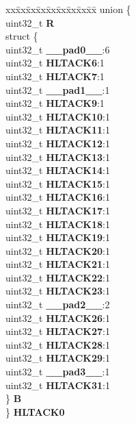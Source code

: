 \begin{DoxyCompactItemize}
\begin{tabbing}
\end{tabbing}\item 
\mbox{\label{structSIU__tag_a91b2244d376d46e3a6b73408ff06a8c1}} 
\begin{tabbing}
xx\=xx\=xx\=xx\=xx\=xx\=xx\=xx\=xx\=\kill
union \{\\
\>uint32\_t {\bfseries R}\\
\>struct \{\\
\>\>uint32\_t {\bfseries \_\_pad0\_\_}:6\\
\>\>uint32\_t {\bfseries HLTACK6}:1\\
\>\>uint32\_t {\bfseries HLTACK7}:1\\
\>\>uint32\_t {\bfseries \_\_pad1\_\_}:1\\
\>\>uint32\_t {\bfseries HLTACK9}:1\\
\>\>uint32\_t {\bfseries HLTACK10}:1\\
\>\>uint32\_t {\bfseries HLTACK11}:1\\
\>\>uint32\_t {\bfseries HLTACK12}:1\\
\>\>uint32\_t {\bfseries HLTACK13}:1\\
\>\>uint32\_t {\bfseries HLTACK14}:1\\
\>\>uint32\_t {\bfseries HLTACK15}:1\\
\>\>uint32\_t {\bfseries HLTACK16}:1\\
\>\>uint32\_t {\bfseries HLTACK17}:1\\
\>\>uint32\_t {\bfseries HLTACK18}:1\\
\>\>uint32\_t {\bfseries HLTACK19}:1\\
\>\>uint32\_t {\bfseries HLTACK20}:1\\
\>\>uint32\_t {\bfseries HLTACK21}:1\\
\>\>uint32\_t {\bfseries HLTACK22}:1\\
\>\>uint32\_t {\bfseries HLTACK23}:1\\
\>\>uint32\_t {\bfseries \_\_pad2\_\_}:2\\
\>\>uint32\_t {\bfseries HLTACK26}:1\\
\>\>uint32\_t {\bfseries HLTACK27}:1\\
\>\>uint32\_t {\bfseries HLTACK28}:1\\
\>\>uint32\_t {\bfseries HLTACK29}:1\\
\>\>uint32\_t {\bfseries \_\_pad3\_\_}:1\\
\>\>uint32\_t {\bfseries HLTACK31}:1\\
\>\} {\bfseries B}\\
\} {\bfseries HLTACK0}\\


\end{tabbing}
\end{DoxyCompactItemize}
